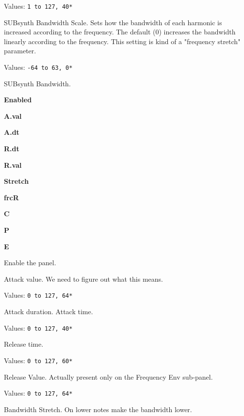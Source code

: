    Values: \texttt{1 to 127, 40*}

   SUBsynth Bandwidth Scale.
   Sets how the bandwidth of each harmonic is increased according to the
   frequency. The default (0) increases the bandwidth linearly according to
   the frequency.
   This setting is kind of a "frequency stretch" parameter.

   Values: \texttt{-64 to 63, 0*}

   SUBsynth Bandwidth.

   \begin{enumber}
      \item \textbf{Enabled}
      \item \textbf{A.val}
      \item \textbf{A.dt}
      \item \textbf{R.dt}
      \item \textbf{R.val}
      \item \textbf{Stretch}
      \item \textbf{frcR}
      \item \textbf{C}
      \item \textbf{P}
      \item \textbf{E}
   \end{enumber}

   \setcounter{ItemCounter}{0}      %

   Enable the panel.

   Attack value.
   We need to figure out what this means.

   Values: \texttt{0 to 127, 64*}

   Attack duration. Attack time.

   Values: \texttt{0 to 127, 40*}

   Release time.

   Values: \texttt{0 to 127, 60*}

   Release Value.
   Actually present only on the Frequency Env sub-panel.

   Values: \texttt{0 to 127, 64*}

   Bandwidth Stretch. On lower notes make the bandwidth lower.

